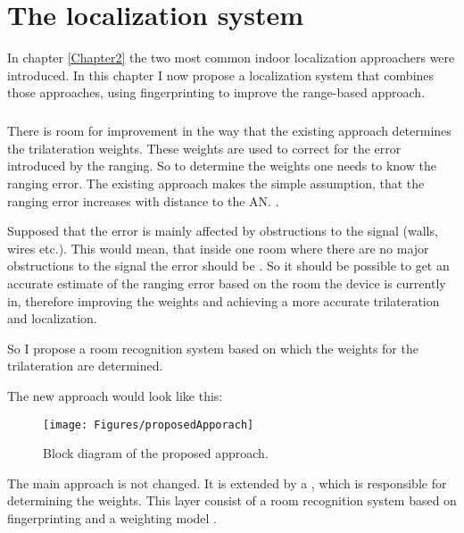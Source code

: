 \chapter{The localization system} %

\label{Chapter3} %

In chapter \ref{Chapter2} the two most common indoor localization approachers were introduced. In this chapter I now propose a localization system that combines those approaches, using fingerprinting to improve the range-based approach.

\paragraph{}
There is room for improvement in the way that the existing approach determines the trilateration weights. These weights are used to correct for the error introduced by the ranging. So to determine the weights one needs to know the ranging error. The existing approach makes the simple assumption, that the ranging error increases with distance to the AN. .

Supposed that the error is mainly affected by obstructions to the signal (walls, wires etc.). This would mean, that inside one room where there are no major obstructions to the signal the error should be . So it should be possible to get an accurate estimate of the ranging error based on the room the device is currently in, therefore improving the weights and achieving a more accurate trilateration and localization.

So I propose a room recognition system based on which the weights for the trilateration are determined.

\noindent The new approach would look like this:

\begin{figure}[ht]
\centering
\texttt{[image: Figures/proposedApporach]}
\decoRule
\caption[The proposed approach]{Block diagram of the proposed approach.}
\label{fig:proposedApproach}
\end{figure}

The main approach is not changed. It is extended by a , which is responsible for determining the weights. This layer consist of a room recognition system based on fingerprinting and a weighting model .

